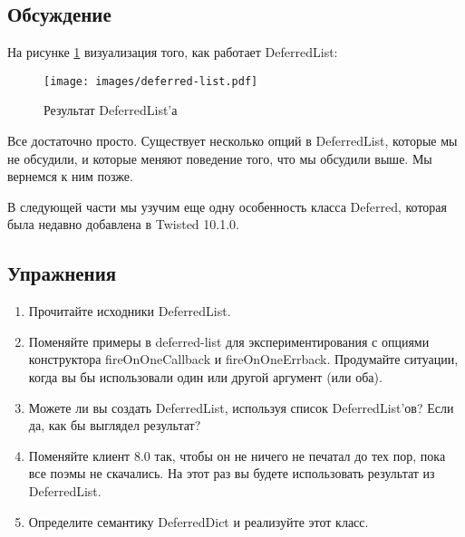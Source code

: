 \subsection{Обсуждение}

На рисунке \ref{fig:deferred-list} визуализация того, 
как работает DeferredList: 

\begin{figure}[h]
\begin{center}
    \texttt{[image: images/deferred-list.pdf]}
    \caption{Результат DeferredList'а\label{fig:deferred-list}}
\end{center}
\end{figure}


Все достаточно просто. Существует несколько опций в DeferredList, 
которые мы не обсудили, и которые меняют поведение того, что 
мы обсудили выше. Мы вернемся к ним позже.


В следующей части мы узучим еще одну особенность класса 
Deferred, которая была недавно добавлена в Twisted 10.1.0.


\subsection{Упражнения}

\begin{enumerate}
\item Прочитайте исходники DeferredList.

\item Поменяйте примеры в deferred-list для экспериментирования с 
    опциями конструктора fireOnOneCallback и fireOnOneErrback. Продумайте 
    ситуации, когда вы бы использовали один или другой аргумент (или оба).

\item Можете ли вы создать DeferredList, используя список DeferredList'ов? 
    Если да, как бы выглядел результат?

\item Поменяйте клиент 8.0 так, чтобы он не ничего не печатал до тех 
    пор, пока все поэмы не скачались. На этот раз вы будете использовать 
    результат из DeferredList.

\item Определите семантику DeferredDict и реализуйте этот класс.

\end{enumerate}

